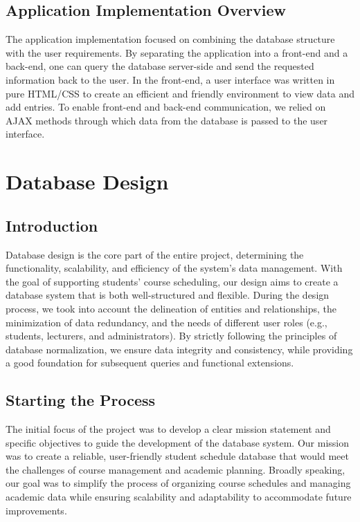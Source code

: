 \documentclass[12pt]{article}
\begin{document}
\subsection{Application Implementation Overview}
The application implementation focused on combining the database structure with the user requirements. By separating the application into a front-end and a back-end, one can query the database server-side and send the requested information back to the user. In the front-end, a user interface was written in pure HTML/CSS to create an efficient and friendly environment to view data and add entries. To enable front-end and back-end communication, we relied on AJAX methods through which data from the database is passed to the user interface.


\section{Database Design}

\subsection{Introduction}
Database design is the core part of the entire project, determining the functionality, scalability, and efficiency of the system's data management. With the goal of supporting students' course scheduling, our design aims to create a database system that is both well-structured and flexible. During the design process, we took into account the delineation of entities and relationships, the minimization of data redundancy, and the needs of different user roles (e.g., students, lecturers, and administrators). By strictly following the principles of database normalization, we ensure data integrity and consistency, while providing a good foundation for subsequent queries and functional extensions.

\subsection{Starting the Process}
The initial focus of the project was to develop a clear mission statement and specific objectives to guide the development of the database system. Our mission was to create a reliable, user-friendly student schedule database that would meet the challenges of course management and academic planning. Broadly speaking, our goal was to simplify the process of organizing course schedules and managing academic data while ensuring scalability and adaptability to accommodate future improvements.
\end{document}
